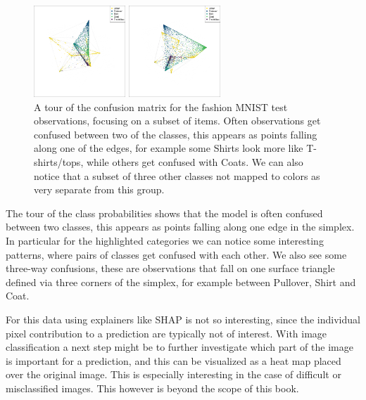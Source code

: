 \documentclass[
  letterpaper,
]{krantz}
\begin{document}
\begin{figure}
%
\begin{minipage}{0.33\linewidth}
\includegraphics[width=1.35417in,height=\textheight]{images/fashion_confusion_gt_212.png}\end{minipage}%
%
\begin{minipage}{0.33\linewidth}
\includegraphics[width=1.35417in,height=\textheight]{images/fashion_confusion_gt_333.png}\end{minipage}%

\caption{\label{fig-fashion-confusion-split-pdf}A tour of the confusion
matrix for the fashion MNIST test observations, focusing on a subset of
items. Often observations get confused between two of the classes, this
appears as points falling along one of the edges, for example some
Shirts look more like T-shirts/tops, while others get confused with
Coats. We can also notice that a subset of three other classes not
mapped to colors as very separate from this group.}

\end{figure}%

The tour of the class probabilities shows that the model is often
confused between two classes, this appears as points falling along one
edge in the simplex. In particular for the highlighted categories we can
notice some interesting patterns, where pairs of classes get confused
with each other. We also see some three-way confusions, these are
observations that fall on one surface triangle defined via three corners
of the simplex, for example between Pullover, Shirt and Coat.

For this data using explainers like SHAP is not so interesting, since
the individual pixel contribution to a prediction are typically not of
interest. With image classification a next step might be to further
investigate which part of the image is important for a prediction, and
this can be visualized as a heat map placed over the original image.
This is especially interesting in the case of difficult or misclassified
images. This however is beyond the scope of this book.
\end{document}
